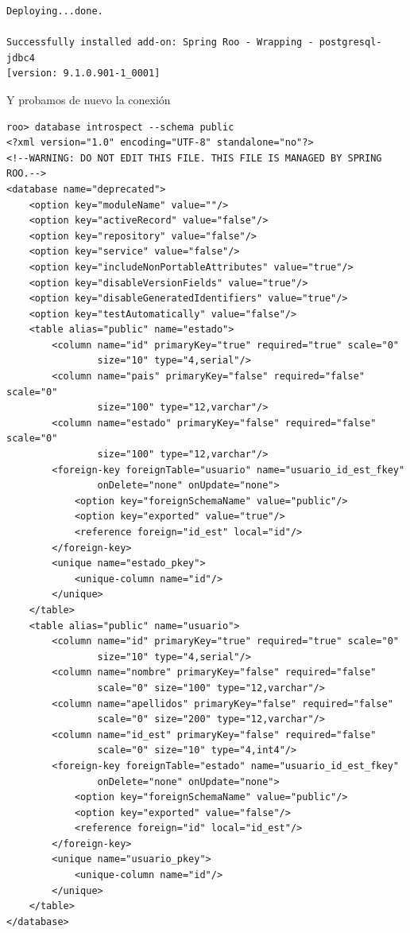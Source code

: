 \documentclass[12pt]{article}
\begin{document}
\begin{enumerate}
\begin{lstlisting}[frame=single]
Deploying...done.

Successfully installed add-on: Spring Roo - Wrapping - postgresql-jdbc4 
[version: 9.1.0.901-1_0001]
\end{lstlisting}

Y probamos de nuevo la conexión
\begin{lstlisting}[frame=single] 
roo> database introspect --schema public
<?xml version="1.0" encoding="UTF-8" standalone="no"?>
<!--WARNING: DO NOT EDIT THIS FILE. THIS FILE IS MANAGED BY SPRING ROO.-->
<database name="deprecated">
    <option key="moduleName" value=""/>
    <option key="activeRecord" value="false"/>
    <option key="repository" value="false"/>
    <option key="service" value="false"/>
    <option key="includeNonPortableAttributes" value="true"/>
    <option key="disableVersionFields" value="true"/>
    <option key="disableGeneratedIdentifiers" value="true"/>
    <option key="testAutomatically" value="false"/>
    <table alias="public" name="estado">
        <column name="id" primaryKey="true" required="true" scale="0" 
                size="10" type="4,serial"/>
        <column name="pais" primaryKey="false" required="false" scale="0" 
                size="100" type="12,varchar"/>
        <column name="estado" primaryKey="false" required="false" scale="0" 
                size="100" type="12,varchar"/>
        <foreign-key foreignTable="usuario" name="usuario_id_est_fkey" 
                onDelete="none" onUpdate="none">
            <option key="foreignSchemaName" value="public"/>
            <option key="exported" value="true"/>
            <reference foreign="id_est" local="id"/>
        </foreign-key>
        <unique name="estado_pkey">
            <unique-column name="id"/>
        </unique>
    </table>
    <table alias="public" name="usuario">
        <column name="id" primaryKey="true" required="true" scale="0" 
                size="10" type="4,serial"/>
        <column name="nombre" primaryKey="false" required="false" 
                scale="0" size="100" type="12,varchar"/>
        <column name="apellidos" primaryKey="false" required="false" 
                scale="0" size="200" type="12,varchar"/>
        <column name="id_est" primaryKey="false" required="false" 
                scale="0" size="10" type="4,int4"/>
        <foreign-key foreignTable="estado" name="usuario_id_est_fkey" 
                onDelete="none" onUpdate="none">
            <option key="foreignSchemaName" value="public"/>
            <option key="exported" value="false"/>
            <reference foreign="id" local="id_est"/>
        </foreign-key>
        <unique name="usuario_pkey">
            <unique-column name="id"/>
        </unique>
    </table>
</database>
\end{lstlisting}


\end{enumerate}
\end{document}
